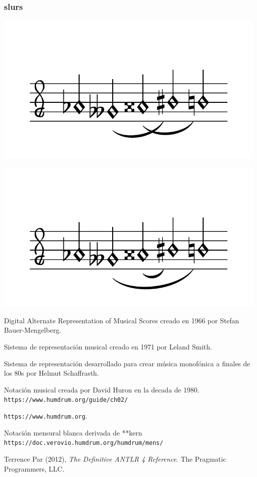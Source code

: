 \documentclass{article}
\begin{document}
    \subsubsection{slurs}
        \includegraphics[scale=0.6]{figures_tests/pdf/smens/slur1.pdf}


        \includegraphics[scale=0.6]{figures_tests/pdf/smens/slur2.pdf}



\medskip

\begin{thebibliography}{9}
    Digital Alternate Representation of Musical Scores creado en 1966 por Stefan Bauer-Mengelberg.

    Sistema de representación musical creado en 1971 por Leland Smith.

    Sistema de representación desarrollado para crear música monofónica a finales de los 80s por Helmut Schaffrasth.

    Notación musical creada por David Huron en la decada de 1980.
    \texttt{https://www.humdrum.org/guide/ch02/}

    \texttt{https://www.humdrum.org}.

    Notación mensural blanca derivada de **kern
    \texttt{https://doc.verovio.humdrum.org/humdrum/mens/}

    Terrence Par (2012), \textit{The Definitive ANTLR 4 Reference}. The Pragmatic Programmers, LLC.



\end{thebibliography}
\end{document}
